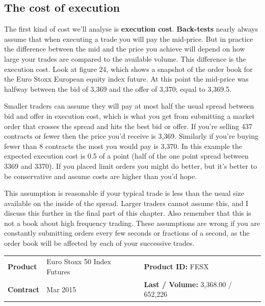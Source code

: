 \subsection*{The cost of execution}

The first kind of cost we'll analyse is \textbf{execution cost}. \textbf{Back-tests} nearly always assume that when executing a trade you will pay the mid-price. But in practice the difference between the mid and the price you achieve will depend on how large your trades are compared to the available volume. This difference is the execution cost. Look at figure 24, which shows a snapshot of the order book for the Euro Stoxx European equity index future. At this point the mid-price was halfway between the bid of 3,369 and the offer of 3,370; equal to 3,369.5.

Smaller traders can assume they will pay at most half the usual spread between bid and offer in execution cost, which is what you get from submitting a market order that crosses the spread and hits the best bid or offer. If you're selling 437 contracts or fewer then the price you'd receive is 3,369. Similarly if you're buying fewer than 8 contracts the most you would pay is 3,370. In this example the expected execution cost is 0.5 of a point (half of the one point spread between 3369 and 3370). If you placed limit orders you might do better, but it's better to be conservative and assume costs are higher than you'd hope.

This assumption is reasonable if your typical trade is less than the usual size available on the inside of the spread. Larger traders cannot assume this, and I discuss this further in the final part of this chapter. Also remember that this is not a book about high frequency trading. These assumptions are wrong if you are constantly submitting orders every few seconds or fractions of a second, as the order book will be affected by each of your successive trades.

 \begingroup \scriptsize \setlength{\tabcolsep}{4pt} \renewcommand{\arraystretch}{1.08} \noindent\begin{tabularx}{\textwidth}{@{} lXl@{}}\textbf{Product} & Euro Stoxx 50 Index Futures & \textbf{Product ID:} FESX \\
\textbf{Contract} & Mar 2015 & \textbf{Last / Volume:} 3,368.00 / 652,226 \\
\end{tabularx}

